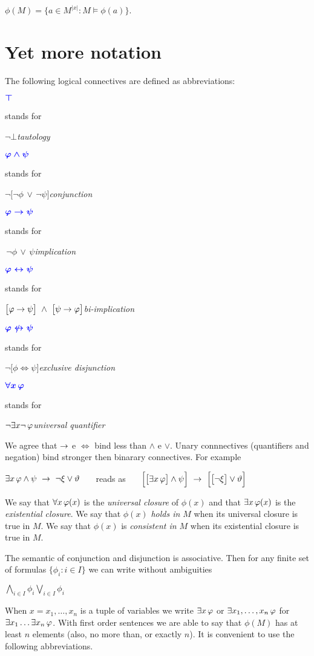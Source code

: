 \hfil$\phi(M)=\big\{a\in M^{|x|}: M\models\phi(a)\big\}$.


\section{Yet more notation}\label{Altriconnettivi}


\def\medrel#1{\parbox[t]{15ex}{\hfil #1}}
\def\ceq#1#2#3{\parbox{20ex}{$\displaystyle #1$}\medrel{#2}$\displaystyle  #3$\hfill}

The following logical connectives are defined as abbreviations:

\ceq{\hfill\emph{$\top$}}{stands for}{\neg\bot}\emph{tautology}

\ceq{\hfill\emph{$\phi\wedge\psi$}}{stands for}{\neg\big[\neg\phi\,\vee\,\neg\psi\big]}\emph{conjunction}

\ceq{\hfill\emph{$\phi\imp\psi$}}{stands for}{\,\neg\phi\,\vee\,\psi}\emph{implication}

\ceq{\hfill\emph{$\phi\iff\psi$}}{stands for}{\big[\phi\imp\psi\big]\ \wedge\ \big[\psi\imp\phi\big]}\emph{bi-implication}

\ceq{\hfill\emph{$\phi\niff\psi$}}{stands for}{\neg\big[\phi\iff\psi\big]}\emph{exclusive disjunction}

\ceq{\hfill\emph{$\A x\,\phi$}}{stands for}{\neg\E x\neg\,\phi}\emph{universal quantifier}\bigskip

We agree that $\rightarrow$ e $\iff$ bind less than $\wedge$ e $\vee$.  Unary connnectives (quantifiers and negation) bind stronger then binarary connectives. For example

\hfil$\E x\,\phi \wedge \psi\ \imp\ \neg\xi\vee\theta$ \ \ \ reads as \ \ \ $\Big[\big[\E x\,\phi\big]\wedge\psi\Big]\ \imp\ \Big[\big[\neg\xi\big]\vee\theta\Big]$

We say that $\forall x\,\varphi(x)$ is the \emph{universal closure\/} of $\phi(x)$ and that $\exists x\,\varphi(x)$ is the \emph{existential closure}. We say that $\phi(x)$ \emph{holds in $M$\/} when its universal closure is true in $M$. We say that $\phi(x)$ is \emph{consistent in $M$\/} when its existential closure is true in $M$.

The semantic of conjunction and disjunction is associative. Then for any finite set of formulas $\{\phi_i:i\in I\}$ we can write without ambiguities 

\hfil \emph{$\displaystyle\bigwedge_{i\in I}\phi_i$}\hfil \emph{$\displaystyle\bigvee_{i\in I}\phi_i$}


When $x=x_1,\dots,x_n$ is a tuple of variables we write \emph{$\exists x\,\varphi$\/} or \emph{$\exists x_1,\dots,x_n\,\varphi$\/} for $\exists x_1\dots\exists x_n\,\varphi$.  With first order sentences we are able to say that $\phi(M)$ has at least $n$ elements (also, no more than, or exactly $n$). It is convenient to use the following abbreviations.

